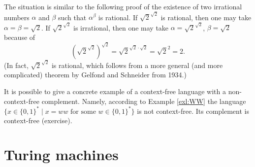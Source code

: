 \begin{page}
\setcounter{section}{7}
\setcounter{subsection}{3}
\setcounter{dfn}{9}
\label{portion:1319}

\begin{rem}
The situation is similar to the following proof of the existence of two irrational numbers $\alpha$ and $\beta$ such that $\alpha^\beta$ is rational.
If $\sqrt{2}^{\sqrt{2}}$ is rational, then one may take $\alpha = \beta = \sqrt{2}$.
If $\sqrt{2}^{\sqrt{2}}$ is irrational, then one may take $\alpha = \sqrt{2}^{\sqrt{2}}$, $\beta = \sqrt{2}$ because of
\[
\left(\sqrt{2}^{\sqrt{2}}\right)^{\sqrt{2}} = \sqrt{2}^{\sqrt{2} \cdot \sqrt{2}} = \sqrt{2}^2 = 2.
\]
(In fact, $\sqrt{2}^{\sqrt{2}}$ is rational, which follows from a more general (and more complicated) theorem by Gelfond and Schneider from 1934.)
\end{rem}

\end{page}

\begin{page}
\setcounter{section}{8}
\setcounter{subsection}{0}
\setcounter{dfn}{9}
\label{portion:1320}


It is possible to give a concrete example of a context-free language with a non-context-free complement.
Namely, according to Example \ref{exl:WW} the language $\{x \in \{0,1\}^* \mid x = ww \text{ for some } w \in \{0,1\}^*\}$
is not context-free. Its complement is context-free (exercise).












\end{page}

\begin{page}
\setcounter{section}{8}
\setcounter{subsection}{1}
\setcounter{dfn}{0}
\label{portion:1322}

\section{Turing machines}

\end{page}

